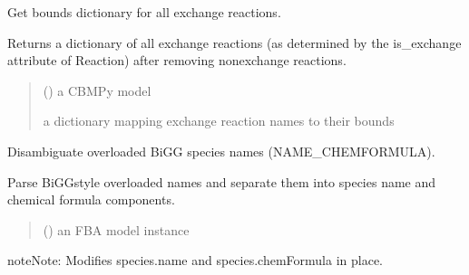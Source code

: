 \documentclass[letterpaper,12pt,english]{sphinxmanual}
\begin{document}
\begin{fulllineitems}
\label{\detokenize{api/core:cbmpy.CBTools.getExchBoundsDict}}
\pysigstartsignatures
\pysiglinewithargsret
{}
{}
{}
\pysigstopsignatures
\sphinxAtStartPar
Get bounds dictionary for all exchange reactions.

\sphinxAtStartPar
Returns a dictionary of all exchange reactions (as determined by the is\_exchange
attribute of Reaction) after removing non\sphinxhyphen{}exchange reactions.
\begin{quote}\begin{description}
\sphinxAtStartPar
{} () \textendash{} a CBMPy model

\sphinxAtStartPar
{} \textendash{} a dictionary mapping exchange reaction names to their bounds

\end{description}\end{quote}

\end{fulllineitems}


\begin{fulllineitems}
\label{\detokenize{api/core:cbmpy.CBTools.processBiGGchemFormula}}
\pysigstartsignatures
\pysiglinewithargsret
{}
{}
{}
\pysigstopsignatures
\sphinxAtStartPar
Disambiguate overloaded BiGG species names (NAME\_CHEMFORMULA).

\sphinxAtStartPar
Parse BiGG\sphinxhyphen{}style overloaded names and separate them into species name
and chemical formula components.
\begin{quote}\begin{description}
\sphinxAtStartPar
{} () \textendash{} an FBA model instance

\end{description}\end{quote}

\begin{sphinxadmonition}{note}{Note:}
\sphinxAtStartPar
Modifies species.name and species.chemFormula in place.
\end{sphinxadmonition}

\end{fulllineitems}
\end{document}
